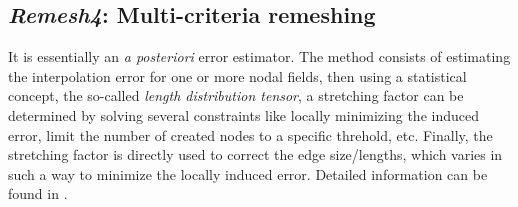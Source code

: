 
\subsection{\emph{Remesh4}: Multi-criteria remeshing}

It is essentially an \emph{a posteriori} error estimator. The method consists of estimating the interpolation error for
one or more nodal fields, then using a statistical concept, the so-called \emph{length distribution tensor}, a stretching factor
can be determined by solving several constraints like locally minimizing the induced error, limit the number of created nodes to
a specific  threhold, etc. Finally, the stretching factor is directly used to correct the edge size/lengths, which varies in such a way to minimize the locally induced error.
Detailed information can be found in \citep{coupez_metric_2011,coupez_edge-based_2013,el_jannoun_space-time_2014}.

